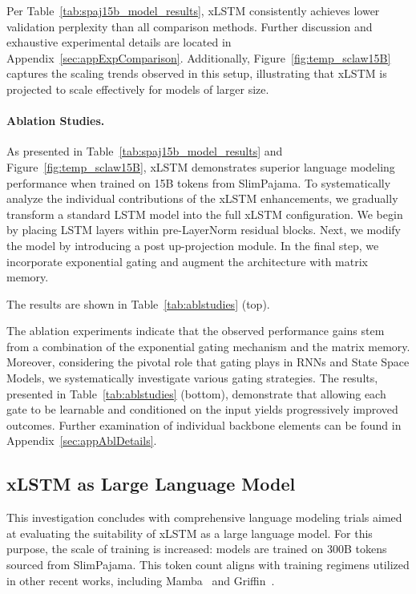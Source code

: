 Per Table~\ref{tab:spaj15b_model_results}, xLSTM consistently achieves lower validation perplexity than all comparison methods. Further discussion and exhaustive experimental details are located in Appendix~\ref{sec:appExpComparison}. Additionally, Figure~\ref{fig:temp_sclaw15B} captures the scaling trends observed in this setup, illustrating that xLSTM is projected to scale effectively for models of larger size.

\paragraph{Ablation Studies.}
As presented in Table~\ref{tab:spaj15b_model_results} and Figure~\ref{fig:temp_sclaw15B}, xLSTM demonstrates superior language modeling performance when trained on 15B tokens from SlimPajama. To systematically analyze the individual contributions of the xLSTM enhancements, we gradually transform a standard LSTM model into the full xLSTM configuration. We begin by placing LSTM layers within pre-LayerNorm residual blocks. Next, we modify the model by introducing a post up-projection module. In the final step, we incorporate exponential gating and augment the architecture with matrix memory.

The results are shown in Table~\ref{tab:ablstudies} (top). 

The ablation experiments indicate that the observed performance gains stem from a combination of the exponential gating mechanism and the matrix memory. Moreover, considering the pivotal role that gating plays in RNNs and State Space Models, we systematically investigate various gating strategies. The results, presented in Table~\ref{tab:ablstudies} (bottom), demonstrate that allowing each gate to be learnable and conditioned on the input yields progressively improved outcomes. Further examination of individual backbone elements can be found in Appendix~\ref{sec:appAblDetails}.

\subsection{xLSTM as Large Language Model}
\label{sec:ExpLanguage}

This investigation concludes with comprehensive language modeling trials aimed at evaluating the suitability of xLSTM as a large language model. For this purpose, the scale of training is increased: models are trained on 300B tokens sourced from SlimPajama. This token count aligns with training regimens utilized in other recent works, including Mamba~\citep{Gu:24arxiv} and Griffin~\citep{De:24arxiv}.

